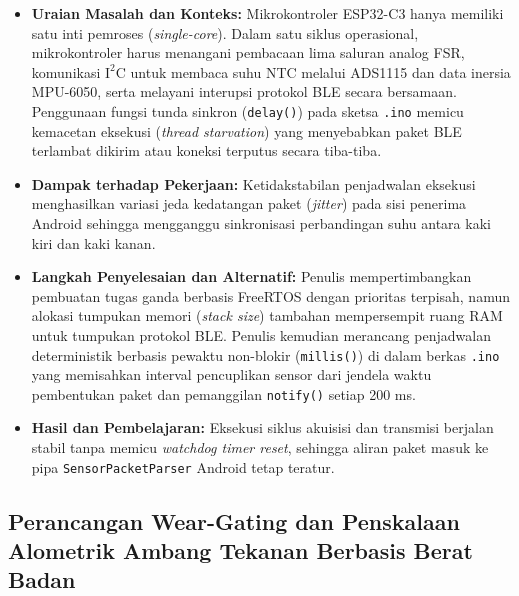 \begin{itemize}
    \item \textbf{Uraian Masalah dan Konteks:} Mikrokontroler ESP32-C3 hanya memiliki satu inti pemroses (\textit{single-core}). Dalam satu siklus operasional, mikrokontroler harus menangani pembacaan lima saluran analog FSR, komunikasi $\text{I}^2\text{C}$ untuk membaca suhu NTC melalui ADS1115 dan data inersia MPU-6050, serta melayani interupsi protokol BLE secara bersamaan. Penggunaan fungsi tunda sinkron (\texttt{delay()}) pada sketsa \texttt{.ino} memicu kemacetan eksekusi (\textit{thread starvation}) yang menyebabkan paket BLE terlambat dikirim atau koneksi terputus secara tiba-tiba.
    \item \textbf{Dampak terhadap Pekerjaan:} Ketidakstabilan penjadwalan eksekusi menghasilkan variasi jeda kedatangan paket (\textit{jitter}) pada sisi penerima Android sehingga mengganggu sinkronisasi perbandingan suhu antara kaki kiri dan kaki kanan.
    \item \textbf{Langkah Penyelesaian dan Alternatif:} Penulis mempertimbangkan pembuatan tugas ganda berbasis FreeRTOS dengan prioritas terpisah, namun alokasi tumpukan memori (\textit{stack size}) tambahan mempersempit ruang RAM untuk tumpukan protokol BLE. Penulis kemudian merancang penjadwalan deterministik berbasis pewaktu non-blokir (\texttt{millis()}) di dalam berkas \texttt{.ino} yang memisahkan interval pencuplikan sensor dari jendela waktu pembentukan paket dan pemanggilan \texttt{notify()} setiap 200 ms.
    \item \textbf{Hasil dan Pembelajaran:} Eksekusi siklus akuisisi dan transmisi berjalan stabil tanpa memicu \textit{watchdog timer reset}, sehingga aliran paket masuk ke pipa \texttt{SensorPacketParser} Android tetap teratur.
\end{itemize}

\subsection{Perancangan Wear-Gating dan Penskalaan Alometrik Ambang Tekanan Berbasis Berat Badan}

